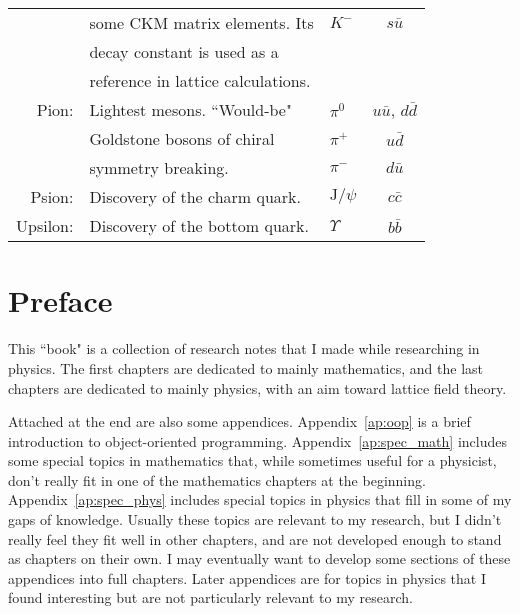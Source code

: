 \documentclass[12pt]{book}
\theoremstyle{definition}
\newenvironment{frontstuff}
  {\centering\chapter*{}}
  {\clearpage}
\begin{document}
\begin{frontstuff}
\begin{tabularx}{\linewidth}{rLlc}
         & some CKM matrix elements. Its 
                                     & $K^-$ &   $s\bar{u}$ \\
         & decay constant is used as a 
                                     &       &              \\
         & reference in lattice calculations.
                                     &       &              
\vspace{2mm}\\
Pion:    & Lightest mesons. ``Would-be"
                                     & $\pi^0$ &   $u\bar{u}$,
                                                   $d\bar{d}$ \\
         & Goldstone bosons of chiral& $\pi^+$ &   $u\bar{d}$ \\
         & symmetry breaking.        & $\pi^-$ &   $d\bar{u}$
\vspace{2mm}\\
Psion:   & Discovery of the charm quark.
         & $\text{J}/\psi$                     &   $c\bar{c}$ 
\vspace{2mm}\\
Upsilon: & Discovery of the bottom quark.
         & $\Upsilon$                          &   $b\bar{b}$ \\
\end{tabularx}
\clearpage

\end{frontstuff} %

\chapter{Preface}
This ``book" is a collection of research notes that I made while researching in
physics. The first chapters are dedicated to mainly mathematics, and the last
chapters are dedicated to mainly physics, with an aim toward lattice field
theory. 

Attached at the end are also some appendices. 
Appendix~\ref{ap:oop} is a brief introduction to object-oriented programming.
Appendix~\ref{ap:spec_math} includes some special topics in mathematics 
that, while sometimes useful for a physicist, don't really fit in one of 
the mathematics chapters at the beginning. Appendix~\ref{ap:spec_phys} includes
special topics in physics that fill in some of my gaps of knowledge. Usually
these topics are relevant to my research, but I didn't really feel they fit
well in other chapters, and are not developed enough to stand as chapters
on their own. I may eventually want
to develop some sections of these appendices into full chapters.
Later appendices are for topics in physics that I found interesting but are
not particularly relevant to my research.
\end{document}
